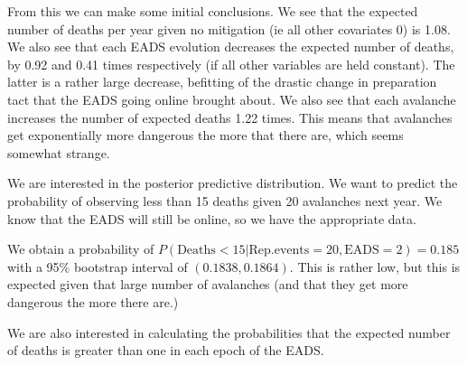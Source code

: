 \documentclass[12pt]{extarticle}
\begin{document}
From this we can make some initial conclusions. We see that the expected number of deaths per year given no mitigation (ie all other covariates 0) is 1.08. We also see that each EADS evolution decreases the expected number of deaths, by 0.92 and 0.41 times respectively (if all other variables are held constant). The latter is a rather large decrease, befitting of the drastic change in preparation tact that the EADS going online brought about. We also see that each avalanche increases the number of expected deaths 1.22 times. This means that avalanches get exponentially more dangerous the more that there are, which seems somewhat strange.

We are interested in the posterior predictive distribution. We want to predict the probability of observing less than 15 deaths given 20 avalanches next year. We know that the EADS will still be online, so we have the appropriate data. 

We obtain a probability of $P(\mathrm{Deaths}<15|\mathrm{Rep.events}=20, \mathrm{EADS}=2) = 0.185$ with a 95\% bootstrap interval of $(0.1838, 0.1864)$. This is rather low, but this is expected given that large number of avalanches (and that they get more dangerous the more there are.)

%

We are also interested in calculating the probabilities that the expected number of deaths is greater than one in each epoch of the EADS. 
\end{document}
